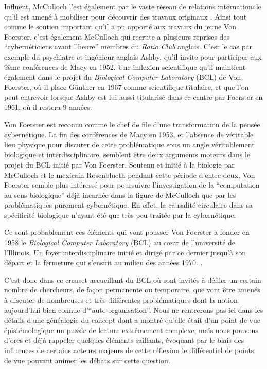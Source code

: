 Influent, McCulloch l'est également par le vaste réseau de relations internationale qu'il est amené à mobiliser pour découvrir des travaux originaux \autocites{Dupuy2005, Husbands2012, Levy1985}. Ainsi tout comme le soutien important qu'il a pu apporté aux travaux du jeune Von Foerster, c'est également McCulloch qui recrute a plusieurs reprises des \enquote{cybernéticiens avant l'heure} membres du \textit{Ratio Club} anglais. C'est le cas par exemple du psychiatre et ingénieur anglais Ashby, qu'il invite pour participer aux 9ème conférences de Macy en 1952. Une inflexion scientifique qu'il maintient également dans le projet du \textit{Biological Computer Laboratory} (BCL) de Von Foerster, où il place Günther en 1967 comme scientifique titulaire, et que l'on peut entrevoir lorsque Ashby est lui aussi titularisé dans ce centre par Foerster en 1961, où il restera 9 années.

Von Foerster est reconnu comme le chef de file d'une transformation de la pensée cybernétique. La fin des conférences de Macy en 1953, et l'absence de véritable lieu physique pour discuter de cette problématique sous un angle véritablement biologique et interdisciplinaire, semblent être deux arguments moteurs dans le projet du BCL initié par Von Foerster. Soutenu et initié à la biologie par McCulloch et le mexicain Rosenblueth pendant cette période d'entre-deux, Von Foerster semble plus intéressé pour poursuivre l'investigation de la \enquote{computation au sens biologique} déjà incarnée dans la figure de McCulloch que par les problématiques purement cybernétique. En effet, la causalité circulaire dans sa spécificité biologique n'ayant été que très peu traitée par la cybernétique.

Ce sont probablement ces éléments qui vont pousser Von Foerster a fonder en 1958 le \textit{Biological Computer Laboratory} (BCL) au cœur de l'université de l'Illinois. Un foyer interdisciplinaire initié et dirigé par ce dernier jusqu'à son départ et la fermeture qui s'ensuit au milieu des années 1970. \autocite{Proulx2003}.

C'est donc dans ce creuset accueillant du BCL où sont invités à défiler un certain nombre de chercheurs, de façon permanente ou temporaire, que vont être amenés à discuter de nombreuses et très différentes problématiques dont la notion aujourd'hui bien connue d'\enquote{auto-organisation}. Nous ne rentrerons pas ici dans les détails d'une généalogie du concept dont \textcite{Stengers1985} a montré qu'elle était d'un point de vue épistémologique un puzzle de lecture extrêmement complexe, mais nous pouvons d'ores et déjà rappeler quelques éléments saillants, évoquant par le biais des influences de certains acteurs majeurs de cette réflexion le différentiel de points de vue pouvant animer les débats sur cette question.


